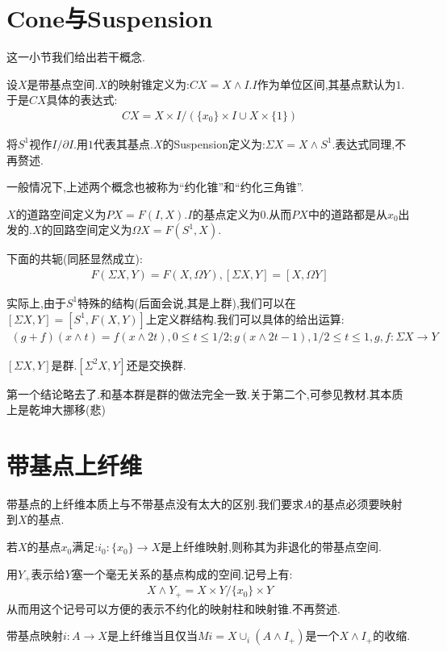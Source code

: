 \section{Cone与Suspension}
这一小节我们给出若干概念.
\begin{definition}
    设$X$是带基点空间.$X$的映射锥定义为:$CX=X \wedge I$.$I$作为单位区间,其基点默认为$1$.于是$CX$具体的表达式:
    \begin{align*}
        CX=X\times I/(\{x_0\}\times I \cup X \times \{1\})
    \end{align*}

    将$S^1$视作$I/\partial I$.用$1$代表其基点.$X$的Suspension定义为:$\Sigma X=X \wedge S^1$.表达式同理,不再赘述.

    一般情况下,上述两个概念也被称为“约化锥”和“约化三角锥”.
\end{definition}
\begin{definition}
    $X$的道路空间定义为$PX=F(I,X)$.$I$的基点定义为$0$.从而$PX$中的道路都是从$x_0$出发的.$X$的回路空间定义为$\Omega X=F(S^1,X)$.
\end{definition}
\begin{proposition}
    下面的共轭(同胚显然成立):
    \begin{align*}
        F(\Sigma X,Y)=F(X,\Omega Y),[\Sigma X,Y]=[X,\Omega Y]
    \end{align*}
\end{proposition}
实际上,由于$S^1$特殊的结构(后面会说,其是上群),我们可以在$[\Sigma X,Y]=[S^1,F(X,Y)]$上定义群结构.我们可以具体的给出运算:
\begin{align*}
    (g+f)(x \wedge t)=f(x \wedge 2t),0\leq t \leq 1/2;g(x\wedge 2t-1),1/2\leq t \leq 1,g,f:\Sigma X \to Y
\end{align*}

\begin{lemma}
    $[\Sigma X,Y]$是群.$[\Sigma^2 X,Y]$还是交换群.
\end{lemma}
第一个结论略去了.和基本群是群的做法完全一致.关于第二个,可参见教材.其本质上是乾坤大挪移(悲)
\section{带基点上纤维}
带基点的上纤维本质上与不带基点没有太大的区别.我们要求$A$的基点必须要映射到$X$的基点.

\begin{definition}
    若$X$的基点$x_0$满足:$i_0:\{x_0\} \to X$是上纤维映射,则称其为非退化的带基点空间.
\end{definition}
用$Y_{+}$表示给$Y$塞一个毫无关系的基点构成的空间.记号上有:
\begin{align*}
    X \wedge Y_{+}=X \times Y/\{x_0\}\times Y
\end{align*}
从而用这个记号可以方便的表示不约化的映射柱和映射锥.不再赘述.
\begin{proposition}
    带基点映射$i:A \to X$是上纤维当且仅当$Mi=X \cup_i (A \wedge I_{+})$是一个$X \wedge I_{+}$的收缩.
\end{proposition}


